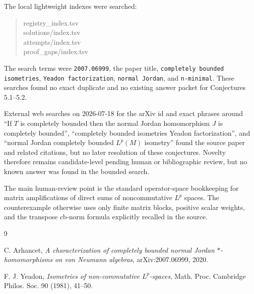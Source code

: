 \documentclass[11pt]{amsart}
\theoremstyle{remark}
\begin{document}
The local lightweight indexes were searched:
\begin{quote}
\ttfamily
registry\_index.tsv\\
solutions/index.tsv\\
attempts/index.tsv\\
proof\_gaps/index.tsv
\end{quote}
The search terms were \texttt{2007.06999}, the paper title,
\texttt{completely bounded isometries}, \texttt{Yeadon factorization},
\texttt{normal Jordan}, and \texttt{n-minimal}.  These searches found no exact
duplicate and no existing answer packet for Conjectures 5.1--5.2.

External web searches on 2026-07-18 for the arXiv id and exact phrases around
``If $T$ is completely bounded then the normal Jordan homomorphism $J$ is
completely bounded'', ``completely bounded isometries Yeadon factorization'',
and ``normal Jordan completely bounded $L^p(M)$ isometry'' found the source
paper and related citations, but no later resolution of these conjectures.
Novelty therefore remains candidate-level pending human or bibliographic
review, but no known answer was found in the bounded search.

The main human-review point is the standard operator-space bookkeeping for
matrix amplifications of direct sums of noncommutative $L^p$ spaces.  The
counterexample otherwise uses only finite matrix blocks, positive scalar
weights, and the transpose cb-norm formula explicitly recalled in the source.

\begin{thebibliography}{9}

C. Arhancet,
\emph{A characterization of completely bounded normal Jordan
$*$-homomorphisms on von Neumann algebras},
arXiv:2007.06999, 2020.

F. J. Yeadon,
\emph{Isometries of non-commutative $L^p$-spaces},
Math. Proc. Cambridge Philos. Soc. 90 (1981), 41--50.

\end{thebibliography}
\end{document}
